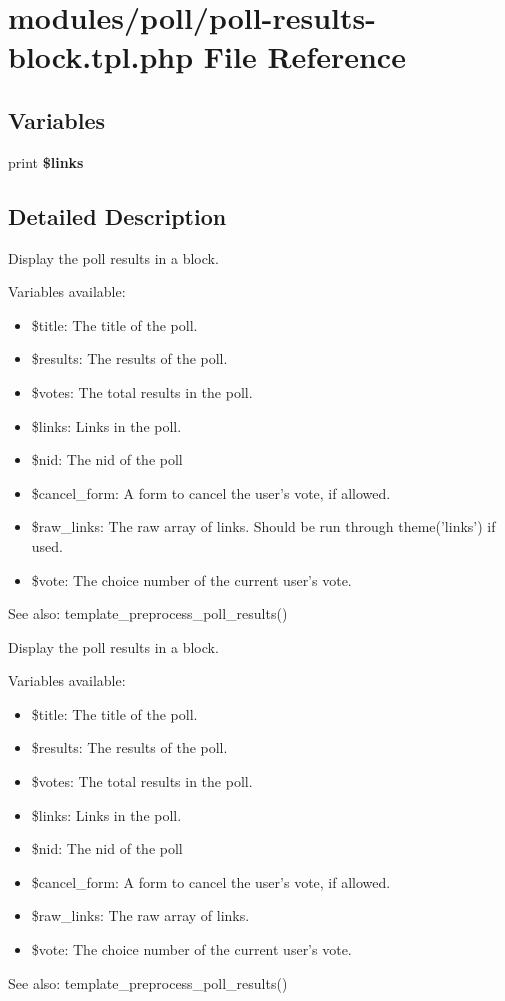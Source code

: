 \hypertarget{poll-results-block_8tpl_8php}{
\section{modules/poll/poll-results-block.tpl.php File Reference}
\label{poll-results-block_8tpl_8php}
}
\subsection*{Variables}
\begin{CompactItemize}
\item 
\hypertarget{poll-results-block_8tpl_8php_67aa641b75422875f72695353fd225ca}{
print \textbf{\$links}}
\label{poll-results-block_8tpl_8php_67aa641b75422875f72695353fd225ca}

\end{CompactItemize}


\subsection{Detailed Description}
Display the poll results in a block.

Variables available:\begin{itemize}
\item \$title: The title of the poll.\item \$results: The results of the poll.\item \$votes: The total results in the poll.\item \$links: Links in the poll.\item \$nid: The nid of the poll\item \$cancel\_\-form: A form to cancel the user's vote, if allowed.\item \$raw\_\-links: The raw array of links. Should be run through theme('links') if used.\item \$vote: The choice number of the current user's vote.\end{itemize}


\begin{Desc}
\item[See also:]template\_\-preprocess\_\-poll\_\-results()\end{Desc}
Display the poll results in a block.

Variables available:\begin{itemize}
\item \$title: The title of the poll.\item \$results: The results of the poll.\item \$votes: The total results in the poll.\item \$links: Links in the poll.\item \$nid: The nid of the poll\item \$cancel\_\-form: A form to cancel the user's vote, if allowed.\item \$raw\_\-links: The raw array of links.\item \$vote: The choice number of the current user's vote.\end{itemize}


\begin{Desc}
\item[See also:]template\_\-preprocess\_\-poll\_\-results() \end{Desc}
